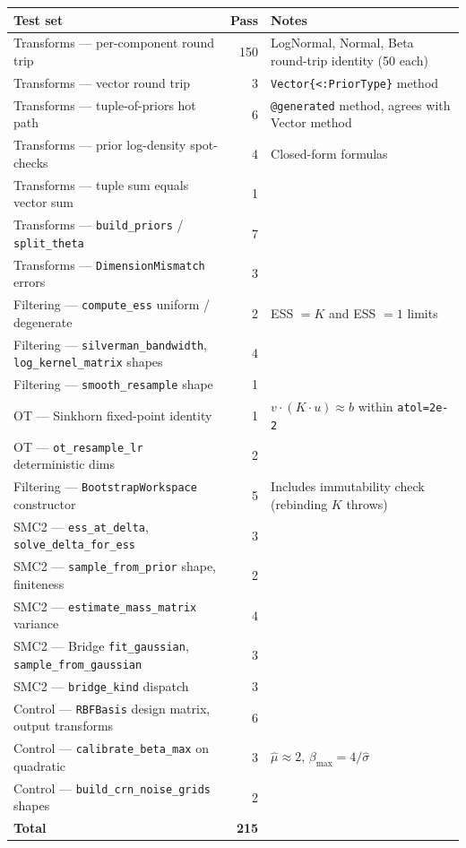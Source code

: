 \documentclass[11pt,a4paper]{article}
\begin{document}
\begin{longtable}{p{}rp{}}
\toprule
\textbf{Test set} & \textbf{Pass} & \textbf{Notes} \\
\midrule
Transforms --- per-component round trip & 150 &
LogNormal, Normal, Beta round-trip identity (50 each) \\
Transforms --- vector round trip & 3 &
\texttt{Vector\{<:PriorType\}} method \\
Transforms --- tuple-of-priors hot path & 6 &
\texttt{@generated} method, agrees with Vector method \\
Transforms --- prior log-density spot-checks & 4 &
Closed-form formulas \\
Transforms --- tuple sum equals vector sum & 1 & \\
Transforms --- \texttt{build\_priors} / \texttt{split\_theta} & 7 & \\
Transforms --- \texttt{DimensionMismatch} errors & 3 & \\
Filtering --- \texttt{compute\_ess} uniform / degenerate & 2 &
ESS $= K$ and ESS $= 1$ limits \\
Filtering --- \texttt{silverman\_bandwidth},
\texttt{log\_kernel\_matrix} shapes & 4 & \\
Filtering --- \texttt{smooth\_resample} shape & 1 & \\
OT --- Sinkhorn fixed-point identity & 1 &
$v \cdot (K \cdot u) \approx b$ within \texttt{atol=2e-2} \\
OT --- \texttt{ot\_resample\_lr} deterministic dims & 2 & \\
Filtering --- \texttt{BootstrapWorkspace} constructor & 5 &
Includes immutability check (rebinding $K$ throws) \\
SMC2 --- \texttt{ess\_at\_delta},
\texttt{solve\_delta\_for\_ess} & 3 & \\
SMC2 --- \texttt{sample\_from\_prior} shape, finiteness & 2 & \\
SMC2 --- \texttt{estimate\_mass\_matrix} variance & 4 & \\
SMC2 --- Bridge \texttt{fit\_gaussian},
\texttt{sample\_from\_gaussian} & 3 & \\
SMC2 --- \texttt{bridge\_kind} dispatch & 3 & \\
Control --- \texttt{RBFBasis} design matrix,
output transforms & 6 & \\
Control --- \texttt{calibrate\_beta\_max} on quadratic & 3 &
$\hat{\mu} \approx 2$, $\beta_\mathrm{max} = 4 / \hat\sigma$ \\
Control --- \texttt{build\_crn\_noise\_grids} shapes & 2 & \\
\midrule
\textbf{Total} & \textbf{215} & \\
\bottomrule
\end{longtable}
\end{document}

